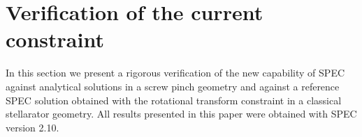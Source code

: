 %
%
%
%
%

 
\section{Verification of the current constraint} \label{sec.verification}
 
 In this section we present a rigorous verification of the new capability of \ac{SPEC} against analytical solutions in a screw pinch geometry and against a reference \ac{SPEC} solution obtained with the rotational transform constraint in a classical stellarator geometry. All results presented in this paper were obtained with \ac{SPEC} version 2.10.
 
